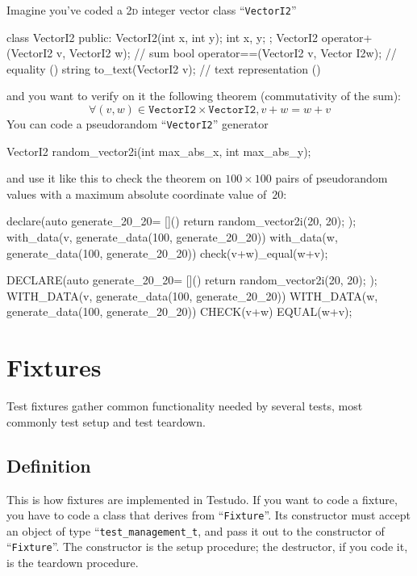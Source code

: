 \documentclass[twoside, a4paper, article]{memoir}
\begin{document}
Imagine you've coded a \textsc{2d} integer vector class ``\texttt{VectorI2}''
\begin{cpplisting}
class VectorI2 {
public:
  VectorI2(int x, int y);
  int x, y;
};
VectorI2 operator+(VectorI2 v, VectorI2 w); // sum
bool operator==(VectorI2 v, Vector I2w); // equality ()
string to_text(VectorI2 v); // text representation %
                               ()
\end{cpplisting}
and you want to verify on it the following theorem (commutativity of the sum):
\begin{equation}
  \label{eq:1}
  \forall (v, w) \in \texttt{VectorI2} \times \texttt{VectorI2}, v + w = w + v
\end{equation}
You can code a pseudorandom ``\texttt{VectorI2}'' generator
\begin{cpplisting}
VectorI2 random_vector2i(int max_abs_x, int max_abs_y);
\end{cpplisting}
and use it like this to check the theorem on $100 \times 100$ pairs of
pseudorandom values with a maximum absolute coordinate value of~$20$:
\begin{cpplisting}
declare(auto generate_20_20=
        []() { return random_vector2i(20, 20); });
with_data(v, generate_data(100, generate_20_20))
  with_data(w, generate_data(100, generate_20_20))
    check(v+w)_equal(w+v);
\end{cpplisting}

\begin{cpplisting}
DECLARE(auto generate_20_20=
        []() { return random_vector2i(20, 20); });
WITH_DATA(v, generate_data(100, generate_20_20))
  WITH_DATA(w, generate_data(100, generate_20_20))
    CHECK(v+w) EQUAL(w+v);
\end{cpplisting}


\chapter{Fixtures}
\label{cha:fixtures}

Test fixtures gather common functionality needed by several tests, most
commonly test setup and test teardown.

\section{Definition}
\label{sec:fixture-definition}

This is how fixtures are implemented in Testudo.  If you want to code a
fixture, you have to code a class that derives from
``\texttt{Fixture}''.  Its constructor must accept an object of type
``\texttt{test\_management\_t}, and pass it out to the constructor of
``\texttt{Fixture}''.  The constructor is the setup procedure; the
destructor, if you code it, is the teardown procedure.
\end{document}
